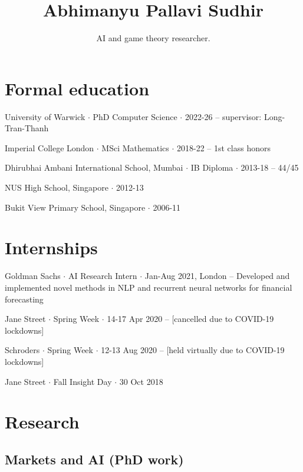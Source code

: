 \documentclass{article}
\title{\Large\bf Abhimanyu Pallavi Sudhir}
\subtitle{AI and game theory researcher. \\ %
\vspace{-2em}}
\newcommand{\archive}{\color{lightgray}}
\begin{document}
\begingroup
\let\center\flushleft
\let\endcenter\endflushleft
\maketitle
\endgroup

\section*{Formal education}
\begin{itemize}
    \item University of Warwick $\cdot$ PhD Computer Science $\cdot$ 2022-26 -- supervisor: Long-Tran-Thanh %
    \item Imperial College London $\cdot$ MSci Mathematics $\cdot$ 2018-22 -- 1st class honors
          {\archive
    \item Dhirubhai Ambani International School, Mumbai $\cdot$ IB Diploma $\cdot$ 2013-18 -- 44/45
    \item NUS High School, Singapore $\cdot$ 2012-13
    \item Bukit View Primary School, Singapore $\cdot$ 2006-11
          }
\end{itemize}

\section*{Internships}
\begin{itemize}
    \item Goldman Sachs $\cdot$ AI Research Intern $\cdot$ Jan-Aug 2021, London -- Developed and implemented novel methods in NLP and recurrent neural networks for financial forecasting
          {\archive
    \item Jane Street $\cdot$ Spring Week $\cdot$ 14-17 Apr 2020 -- [cancelled due to COVID-19 lockdowns]
    \item Schroders $\cdot$ Spring Week $\cdot$ 12-13 Aug 2020 -- [held virtually due to COVID-19 lockdowns]
    \item Jane Street $\cdot$ Fall Insight Day $\cdot$ 30 Oct 2018
          }
\end{itemize}

\section*{Research}

\subsection*{Markets and AI (PhD work)}
\end{document}
